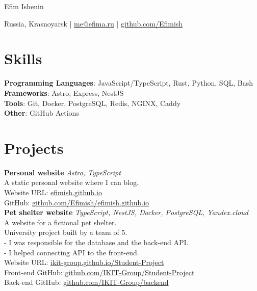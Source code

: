 \documentclass[a4paper, 12pt]{article}
\begin{document}
\centerline{\Huge Efim Ishenin}
\vspace{10pt}
\centerline{
  Russia, Krasnoyarsk |
  \href{mailto:me@efima.ru}{me@efima.ru} |
  \href{https://github.com/Efimish}{github.com/Efimish}
}

\section{Skills}

\textbf{Programming Languages}: JavaScript/TypeScript, Rust, Python, SQL, Bash \\
\textbf{Frameworks}: Astro, Express, NestJS \\
\textbf{Tools}: Git, Docker, PostgreSQL, Redis, NGINX, Caddy \\
\textbf{Other}: GitHub Actions

\section{Projects}

\textbf{Personal website} \hfill \textit{Astro, TypeScript} \\
A static personal website where I can blog. \\
Website URL: \href{https://efimish.github.io/}{efimish.github.io} \\
GitHub: \href{https://github.com/Efimish/efimish.github.io}{github.com/Efimish/efimish.github.io} \\

\textbf{Pet shelter website} \hfill \textit{TypeScript, NestJS, Docker, PostgreSQL, Yandex.cloud} \\
A website for a fictional pet shelter. \\
University project built by a team of 5. \\
- I was responsible for the database and the back-end API. \\
- I helped connecting API to the front-end. \\
Website URL: \href{https://ikit-group.github.io/Student-Project/}{ikit-group.github.io/Student-Project} \\
Front-end GitHub: \href{https://github.com/IKIT-Group/Student-Project}{github.com/IKIT-Group/Student-Project} \\
Back-end GitHub: \href{https://github.com/IKIT-Group/backend}{github.com/IKIT-Group/backend} \\
\end{document}
